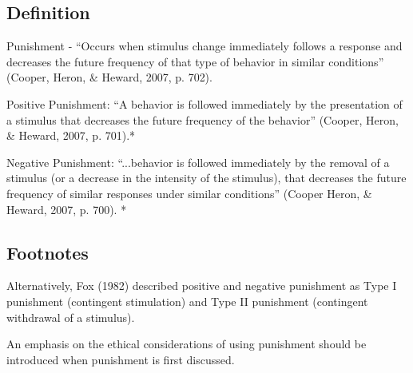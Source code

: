 \subsection{Definition}
Punishment - ``Occurs when stimulus change immediately follows a response and decreases the future frequency of that type of behavior in similar conditions'' (Cooper, Heron, \& Heward, 2007, p. 702).

Positive Punishment: ``A behavior is followed immediately by the presentation of a stimulus that decreases the future frequency of the behavior'' (Cooper, Heron, \& Heward, 2007, p. 701).*

Negative Punishment: ``...behavior is followed immediately by the removal of a stimulus (or a decrease in the intensity of the stimulus), that decreases the future frequency of similar responses under similar conditions'' (Cooper Heron, \& Heward, 2007, p. 700). *

\subsection{Footnotes}
Alternatively, Fox (1982) described positive and negative punishment as Type I punishment (contingent stimulation) and Type II punishment (contingent withdrawal of a stimulus).

An emphasis on the ethical considerations of using punishment should be introduced when punishment is first discussed.
